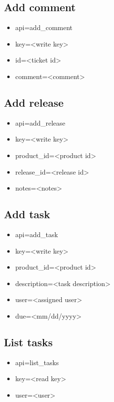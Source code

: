 \documentclass[11pt]{article}
\begin{document}
\subsection{Add comment}

\begin{itemize}
\item api=add\_comment
\item key=<write key>
\item id=<ticket id>
\item comment=<comment>
\end{itemize}

\subsection{Add release}

\begin{itemize}
\item api=add\_release
\item key=<write key>
\item product\_id=<product id>
\item release\_id=<release id>
\item notes=<notes>
\end{itemize}

\subsection{Add task}

\begin{itemize}
\item api=add\_task
\item key=<write key>
\item product\_id=<product id>
\item description=<task description>
\item user=<assigned user>
\item due=<mm/dd/yyyy>
\end{itemize}

\subsection{List tasks}

\begin{itemize}
\item api=list\_tasks
\item key=<read key>
\item user=<user>
\end{itemize}
\end{document}
